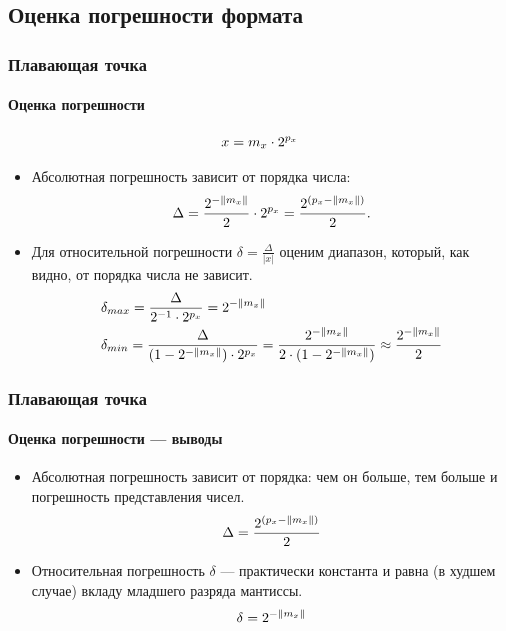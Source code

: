 \subsection{Оценка погрешности формата}

\begin{frame}
    \frametitle{Плавающая точка}
    \framesubtitle{Оценка погрешности}

    \[
        x = m_{x}\cdot {2}^{p_{x}}
    \]
    
    \begin{itemize}
        \item Абсолютная погрешность зависит от порядка числа:
        \[
            \Delta=
                \frac{2^{-\lVert m_{x}\rVert}}{2}\cdot 2^{p_{x}}=
                \frac{2^{(p_{x} - \lVert m_{x}\rVert)}}
                     {2}.
        \]
        
        \item Для относительной погрешности $\delta=\frac{\Delta}{|x|}$ оценим диапазон, который, как видно, от порядка числа не зависит.
        \begin{align*}
            &\delta_{max}=\frac{\Delta}{2^{-1}\cdot 2^{p_{x}}}=
                2^{-\lVert m_{x}\rVert}
            \\            
            &\delta_{min}=
                \frac{\Delta}
                     {(1-2^{-\lVert m_{x}\rVert})\cdot 2^{p_{x}}}= 
                \frac{2^{- \lVert m_{x}\rVert}}
                     {2\cdot(1-2^{-\lVert m_{x}\rVert})}\approx 
                     \frac{2^{-\lVert m_{x}\rVert}}{2}
        \end{align*}
    \end{itemize}
\end{frame}

\begin{frame}
    \frametitle{Плавающая точка}
    \framesubtitle{Оценка погрешности --- выводы}

    \begin{itemize}
        \item Абсолютная погрешность зависит от порядка: чем он больше, тем больше и погрешность представления чисел. 
        \[
            \Delta = \frac{2^{(p_{x} - \lVert m_{x}\rVert)}}
                     {2}
        \]        
        
        \item Относительная погрешность $\delta$ --- практически константа и равна (в худшем случае) вкладу младшего разряда мантиссы.
        \[
            \delta = 2^{-\lVert m_{x}\rVert}
        \]        
        
    \end{itemize}
\end{frame}

